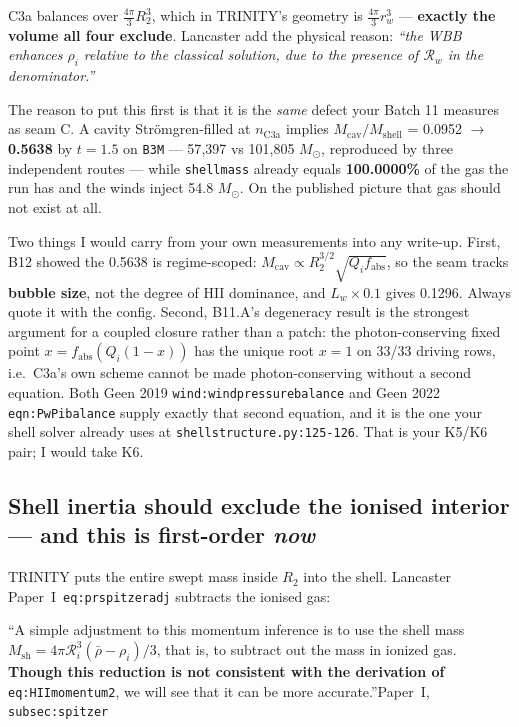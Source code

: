 \documentclass[11pt,a4paper,oneside]{report}
\newcommand{\brkus}{\textunderscore\allowbreak}
\newcommand{\code}[1]{\texttt{\small\let\_\brkus #1}}
\newcommand{\lbl}[1]{\texttt{\footnotesize\let\_\brkus #1}}
\newcommand{\PI}{Paper~I}
\newcommand{\Rw}{\mathcal{R}_{w}}
\newcommand{\Ri}{\mathcal{R}_{i}}
\newcommand{\rhobar}{\bar\rho}
\newcommand{\Msh}{M_{\mathrm{sh}}}
\newcommand{\up}[1]{\textcolor{tqaccent}{\textbf{#1}}}
\begin{document}
C3a balances over $\tfrac{4\pi}{3}R_2^3$, which in TRINITY's geometry is
$\tfrac{4\pi}{3}r_w^3$ --- \up{exactly the volume all four exclude}. Lancaster add the
physical reason: \emph{``the WBB enhances $\rho_i$ relative to the classical solution, due to
the presence of $\Rw$ in the denominator.''}

The reason to put this first is that it is the \emph{same} defect your Batch 11 measures as
seam C. A cavity Str\"omgren-filled at $n_{\mathrm{C3a}}$ implies
$M_{\mathrm{cav}}/M_{\mathrm{shell}}$ = 0.0952 $\to$ \up{0.5638} by $t=1.5$ on
\code{B3M} --- 57{,}397 vs 101{,}805 $M_\odot$, reproduced by three independent routes ---
while \code{shell\_mass} already equals \up{100.0000\%} of the gas the run has and the winds
inject 54.8 $M_\odot$. On the published picture that gas should not exist at all.

\medskip
Two things I would carry from your own measurements into any write-up. First, B12 showed the
0.5638 is regime-scoped: $M_{\mathrm{cav}}\propto R_2^{3/2}\sqrt{Q_if_{\mathrm{abs}}}$, so
the seam tracks \up{bubble size}, not the degree of HII dominance, and $L_w\times0.1$ gives
0.1296. Always quote it with the config. Second, B11.A's degeneracy result is the strongest
argument for a coupled closure rather than a patch: the photon-conserving fixed point
$x = f_{\mathrm{abs}}(Q_i(1-x))$ has the unique root $x=1$ on 33/33 driving rows, i.e.\ C3a's
own scheme cannot be made photon-conserving without a second equation. Both Geen 2019
\lbl{wind:windpressurebalance} and Geen 2022 \lbl{eqn:PwPibalance} supply exactly that second
equation, and it is the one your shell solver already uses at
\code{shell\_structure.py:125-126}. That is your K5/K6 pair; I would take K6.

\subsection{Shell inertia should exclude the ionised interior --- and this is first-order
\emph{now}}
\label{sec:inertia}

TRINITY puts the entire swept mass inside $R_2$ into the shell. Lancaster \PI\
\lbl{eq:pr\_spitzer\_adj} subtracts the ionised gas:

\begin{litquote}
\small ``A simple adjustment to this momentum inference is to use the shell mass
$\Msh = 4\pi\Ri^3(\rhobar-\rho_i)/3$, that is, to subtract out the mass in ionized gas.
\textbf{Though this reduction is not consistent with the derivation of}
\lbl{eq:HIImomentum2}, we will see that it can be more
accurate.''\hfill{\scriptsize\PI, \lbl{subsec:spitzer}}
\end{litquote}
\end{document}
